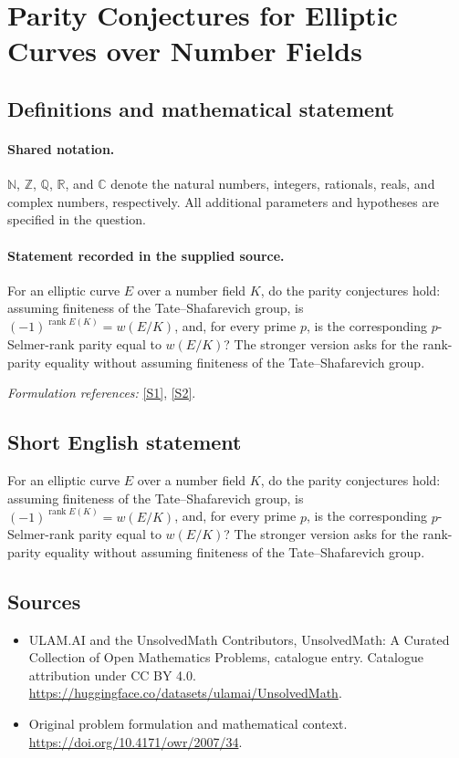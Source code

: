 \documentclass[11pt]{article}
\newcommand{\sref}[2]{\hyperlink{source:#1:#2}{[S#2]}}
\begin{document}
\section{Parity Conjectures for Elliptic Curves over Number Fields}\label{statement}

\subsection{Definitions and mathematical statement}

\paragraph{Shared notation.}$\mathbb N$, $\mathbb Z$, $\mathbb Q$, $\mathbb R$, and $\mathbb C$ denote the natural numbers, integers, rationals, reals, and complex numbers, respectively. All additional parameters and hypotheses are specified in the question.


\paragraph{Statement recorded in the supplied source.}
For an elliptic curve $E$ over a number field $K$, do the parity conjectures hold: assuming finiteness of the Tate–Shafarevich group, is $(-1)^{\operatorname{rank}E(K)}=w(E/K)$, and, for every prime $p$, is the corresponding $p$-Selmer-rank parity equal to $w(E/K)$? The stronger version asks for the rank-parity equality without assuming finiteness of the Tate–Shafarevich group.
\par\smallskip\textit{Formulation references:} \sref{statement}{1}, \sref{statement}{2}.
\subsection{Short English statement}
For an elliptic curve $E$ over a number field $K$, do the parity conjectures hold: assuming finiteness of the Tate–Shafarevich group, is $(-1)^{\operatorname{rank}E(K)}=w(E/K)$, and, for every prime $p$, is the corresponding $p$-Selmer-rank parity equal to $w(E/K)$? The stronger version asks for the rank-parity equality without assuming finiteness of the Tate–Shafarevich group.
\subsection{Sources}
\begin{itemize}
\item[\hypertarget{source:statement:1}{S1}] ULAM.AI and the UnsolvedMath Contributors, UnsolvedMath: A Curated Collection of Open Mathematics Problems, catalogue entry. Catalogue attribution under CC BY 4.0.
\url{https://huggingface.co/datasets/ulamai/UnsolvedMath}.
\item[\hypertarget{source:statement:2}{S2}] Original problem formulation and mathematical context.
\url{https://doi.org/10.4171/owr/2007/34}.
\end{itemize}
\label{end:statement}
\end{document}
